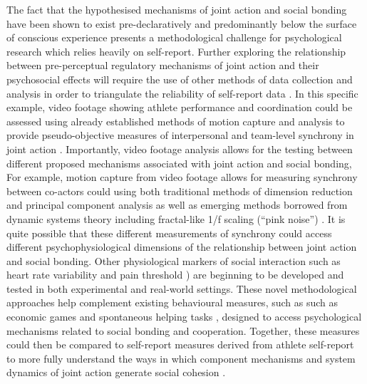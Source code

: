   The fact that the hypothesised mechanisms of joint action and social bonding have been shown to exist pre-declaratively and predominantly below the surface of conscious experience presents a methodological challenge for psychological research which relies heavily on self-report.  Further exploring the relationship between pre-perceptual regulatory mechanisms of joint action and their psychosocial effects will require the use of other methods of data collection and analysis in order to triangulate the reliability of self-report data \citep{Newell2014}.  In this specific example, video footage showing athlete performance and coordination could be assessed using already established methods of motion capture and analysis to provide pseudo-objective measures of interpersonal and team-level synchrony in joint action \citep[e.g.][]{Passos2011}.
  Importantly, video footage analysis allows for the testing between different proposed mechanisms associated with joint action and social bonding,  For example, motion capture from video footage allows for measuring synchrony between co-actors could using both traditional methods of dimension reduction and principal component analysis \citep[see for example][]{Riley2011} as well as emerging methods borrowed from dynamic systems theory including fractal-like 1/f scaling (``pink noise'') \citep[see for example][]{Holden2013}. It is quite possible that these different measurements of synchrony could access different psychophysiological dimensions of the relationship between joint action and social bonding.  Other physiological markers of social interaction such as heart rate variability \citep{Konvalinka2011,Fischer2014a} and pain threshold \citep{Cohen2009,Tarr2015}) are beginning to be developed and tested in both experimental and real-world settings.
  These novel methodological approaches help complement existing behavioural measures, such as such as economic games \citep{Xygalatas2013} and spontaneous helping tasks \citep{Kirschner2010}, designed to access psychological mechanisms related to social bonding and cooperation.
  Together, these measures could then be compared to self-report measures derived from athlete self-report to more fully understand the ways in which component mechanisms and system dynamics of joint action generate social cohesion \citep{Marsh2009}.

